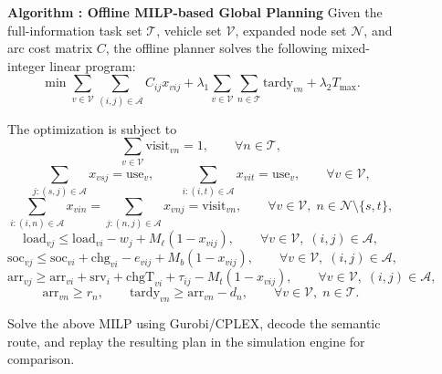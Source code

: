\begin{figure}[t]
  \centering
  \label{alg:offline_milp_planning}
  \begin{minipage}{0.96\textwidth}
  \textbf{Algorithm \thefigure: Offline MILP-based Global Planning}
  \vspace{0.5em}
  Given the full-information task set \(\mathcal{T}\), vehicle set \(\mathcal{V}\), expanded node set \(\mathcal{N}\), and arc cost matrix \(C\), the offline planner solves the following mixed-integer linear program:
  \begin{equation}
  \min \sum_{v\in\mathcal{V}}\sum_{(i,j)\in\mathcal{A}} C_{ij}x_{vij}
  + \lambda_1 \sum_{v\in\mathcal{V}}\sum_{n\in\mathcal{T}} \mathrm{tardy}_{vn}
  + \lambda_2 T_{\max}.
  \end{equation}

  The optimization is subject to
  \begin{equation}
  \sum_{v\in\mathcal{V}} \mathrm{visit}_{vn}=1,
  \qquad \forall n\in\mathcal{T},
  \end{equation}
  \begin{equation}
  \sum_{j:(s,j)\in\mathcal{A}} x_{vsj}=\mathrm{use}_v,
  \qquad
  \sum_{i:(i,t)\in\mathcal{A}} x_{vit}=\mathrm{use}_v,
  \qquad \forall v\in\mathcal{V},
  \end{equation}
  \begin{equation}
  \sum_{i:(i,n)\in\mathcal{A}} x_{vin}
  =
  \sum_{j:(n,j)\in\mathcal{A}} x_{vnj}
  = \mathrm{visit}_{vn},
  \qquad \forall v\in\mathcal{V},\; n\in\mathcal{N}\setminus\{s,t\},
  \end{equation}
  \begin{equation}
  \mathrm{load}_{vj}
  \le
  \mathrm{load}_{vi}-w_j + M_{\ell}(1-x_{vij}),
  \qquad \forall v\in\mathcal{V},\; (i,j)\in\mathcal{A},
  \end{equation}
  \begin{equation}
  \mathrm{soc}_{vj}
  \le
  \mathrm{soc}_{vi}+\mathrm{chg}_{vi}-e_{vij}+M_b(1-x_{vij}),
  \qquad \forall v\in\mathcal{V},\; (i,j)\in\mathcal{A},
  \end{equation}
  \begin{equation}
  \mathrm{arr}_{vj}
  \ge
  \mathrm{arr}_{vi}+\mathrm{srv}_i+\mathrm{chgT}_{vi}+\tau_{ij}-M_t(1-x_{vij}),
  \qquad \forall v\in\mathcal{V},\; (i,j)\in\mathcal{A},
  \end{equation}
  \begin{equation}
  \mathrm{arr}_{vn}\ge r_n,
  \qquad
  \mathrm{tardy}_{vn}\ge \mathrm{arr}_{vn}-d_n,
  \qquad \forall v\in\mathcal{V},\; n\in\mathcal{T}.
  \end{equation}

  Solve the above MILP using Gurobi/CPLEX, decode the semantic route, and replay the resulting plan in the simulation engine for comparison.
  \end{minipage}
\end{figure}
